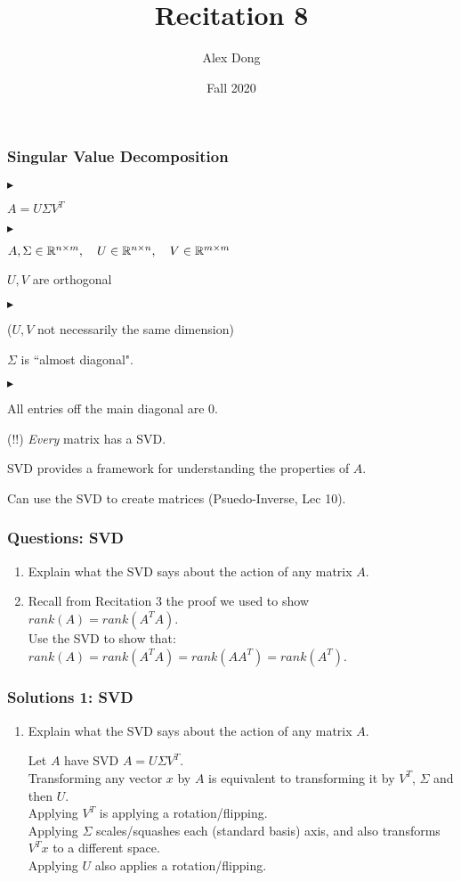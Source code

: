 \documentclass{beamer}
\title{Recitation 8}
\author{Alex Dong}
\institute{CDS, NYU}
\date{Fall 2020}
\renewenvironment{itemize}
\renewenvironment{enumerate}%
{\begin{list}{\arabic{enumi}.}%
      {\setlength{\leftmargin}{2.5em}%
       \setlength{\itemsep}{-\parsep}%
       \setlength{\topsep}{-\parskip}%
       \usecounter{enumi}}%
 }{\end{list}}
\renewenvironment{itemize}%
{\begin{list}{$\blacktriangleright$}%
      {\setlength{\leftmargin}{2.5em}%
       \setlength{\itemsep}{-\parsep}%
       \setlength{\topsep}{-\parskip}%
       \usecounter{enumi}}%
 }{\end{list}}
\begin{document}
\frame{\titlepage} 

\begin{frame}
\frametitle{Singular Value Decomposition}
\begin{itemize}
\item $A = U\Sigma V^T$
\begin{itemize}
\item $A, \Sigma \in \mathbb{R}^{n \times m},\quad U \in \mathbb{R}^{n\times n},\quad V \in \mathbb{R}^{m\times m}$
\item $U,V$ are orthogonal
\begin{itemize}
\item ($U,V$ not necessarily the same dimension)
\end{itemize}
\item $\Sigma$ is ``almost diagonal". 
\begin{itemize}
\item All entries off the main diagonal are 0.
\end{itemize}
\end{itemize}
\item (!!) \textit{Every} matrix has a SVD.
\item SVD provides a framework for understanding the properties of $A$.
\item Can use the SVD to create matrices (Psuedo-Inverse, Lec 10).
\end{itemize}
\end{frame}

\begin{frame}
\frametitle{Questions: SVD}
\begin{enumerate}
\item Explain what the SVD says about the action of any matrix $A$.
\medskip

\item Recall from Recitation 3 the proof we used to show\\
\qquad $rank(A) = rank(A^TA)$.\\
 Use the SVD to show that:\\
 \qquad $rank(A)=rank(A^TA)=rank(AA^T)=rank(A^T)$.
\medskip
\end{enumerate}

\end{frame}


\begin{frame}
\frametitle{Solutions 1: SVD}
\begin{enumerate}
\item Explain what the SVD says about the action of any matrix $A$.
\begin{solution}
Let $A$ have SVD $A=U\Sigma V^T$.\\
Transforming any vector $x$ by $A$ is equivalent to transforming it by $V^T$, $\Sigma$ and then $U$. \\
Applying $V^T$ is applying a rotation/flipping.\\
Applying $\Sigma$ scales/squashes each (standard basis) axis, and also transforms $V^Tx$ to a different space.\\
Applying $U$ also applies a rotation/flipping.
\end{solution}
\end{enumerate}
\end{frame}
\end{document}
